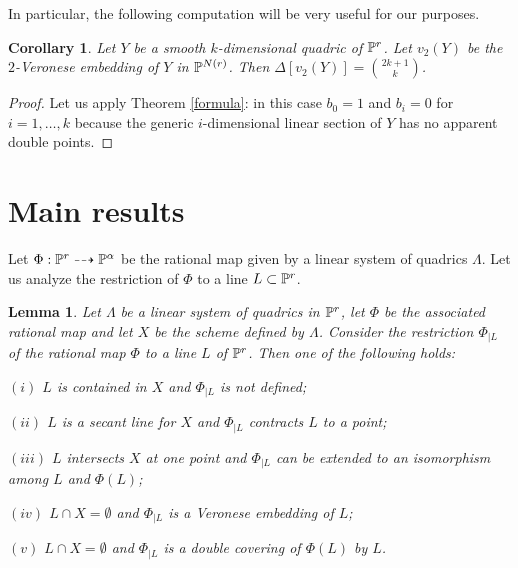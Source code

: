 \documentclass{amsart}
\newtheorem{lemma}{Lemma}
\newtheorem{corollary}{Corollary}
\theoremstyle{definition}
\begin{document}
In particular, the following computation will be very useful for our purposes.

\begin{corollary}\label{corQ}
Let $Y$ be a smooth $k$-dimensional quadric of $\Bbb{P}^{r}$. Let
$v_{2}(Y)$ be the $2$-Veronese embedding of $Y$ in $\Bbb{P}^{N(r)}$.
Then $\Delta [v_{2}(Y)]=\binom{2k+1}{k}$.
\end{corollary}

\begin{proof}
Let us apply Theorem \ref{formula}: in this case $b_{0}=1$ and $b_{i}=0$ for
$i=1,\dots,k$ because the generic $i$-dimensional linear section of $Y$ has no apparent double points.
\end{proof}

\section{Main results}\label{section:main}

Let $\Phi:\Bbb P^r\dashrightarrow\Bbb P^{\alpha}$ be the rational map given by a linear system of quadrics $\Lambda$.
Let us analyze the restriction of $\Phi$ to a line $L\subset\Bbb{P}^{r}$.

\begin{lemma}
\label{lemL} Let $\Lambda $ be a linear system of quadrics in
$\Bbb{P}^{r}$, let $\Phi $ be the associated rational map and let
$X$ be the scheme defined by $\Lambda$. Consider the restriction
$\Phi _{|L}$ of the rational map $\Phi$ to a line $L$ of $\Bbb P^r$.
Then one of the following holds:

$(i)$ $L$ is contained in $X$ and $\Phi_{|L}$ is not defined;

$(ii)$ $L$ is a secant line for $X$ and $\Phi_{|L}$ contracts $L$ to
a point;

$(iii)$ $L$ intersects $X$ at one point and $\Phi_{|L}$ can be
extended to an isomorphism among $L$ and $\Phi(L)$;

$(iv)$ $L\cap X=\emptyset $ and $\Phi_{|L}$ is a Veronese embedding
of $L$;

$(v)$ $L\cap X=\emptyset $ and $\Phi_{|L}$ is a double covering of
$\Phi(L)$ by $L$.
\end{lemma}
\end{document}
